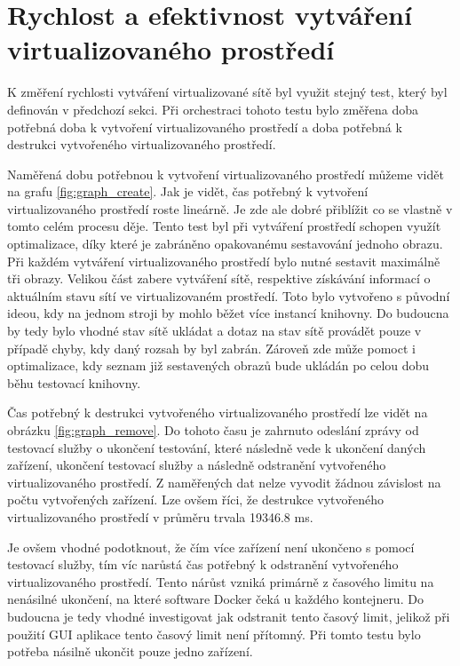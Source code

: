 \section{Rychlost a efektivnost vytváření virtualizovaného prostředí}

K změření rychlosti vytváření virtualizované sítě byl využit stejný test, který byl definován v předchozí sekci. Při orchestraci tohoto testu bylo změřena doba potřebná doba k vytvoření virtualizovaného prostředí a doba potřebná k destrukci vytvořeného virtualizovaného prostředí. 

Naměřená dobu potřebnou k vytvoření virtualizovaného prostředí můžeme vidět na grafu \ref{fig:graph_create}. Jak je vidět, čas potřebný k vytvoření virtualizovaného prostředí roste lineárně. Je zde ale dobré přiblížit co se vlastně v tomto celém procesu děje. Tento test byl při vytváření prostředí schopen využít optimalizace, díky které je zabráněno opakovanému sestavování jednoho obrazu. Při každém vytváření virtualizovaného prostředí bylo nutné sestavit maximálně tři obrazy. Velikou část zabere vytváření sítě, respektive získávání informací o aktuálním stavu sítí ve virtualizovaném prostředí. Toto bylo vytvořeno s původní ideou, kdy na jednom stroji by mohlo běžet více instancí knihovny. Do budoucna by tedy bylo vhodné stav sítě ukládat a dotaz na stav sítě provádět pouze v případě chyby, kdy daný rozsah by byl zabrán. Zároveň zde může pomoct i optimalizace, kdy seznam již sestavených obrazů bude ukládán po celou dobu běhu testovací knihovny.

Čas potřebný k destrukci vytvořeného virtualizovaného prostředí lze vidět na obrázku \ref{fig:graph_remove}. Do tohoto času je zahrnuto odeslání zprávy od testovací služby o ukončení testování, které následně vede k ukončení daných zařízení, ukončení testovací služby a následně odstranění vytvořeného virtualizovaného prostředí. Z naměřených dat nelze vyvodit žádnou závislost na počtu vytvořených zařízení. Lze ovšem říci, že destrukce vytvořeného virtualizovaného prostředí v průměru trvala 19346.8 ms. 

Je ovšem vhodné podotknout, že čím více zařízení není ukončeno s pomocí testovací služby, tím víc narůstá čas potřebný k odstranění vytvořeného virtualizovaného prostředí. Tento nárůst vzniká primárně z časového limitu na nenásilné ukončení, na které software Docker čeká u každého kontejneru. Do budoucna je tedy vhodné investigovat jak odstranit tento časový limit, jelikož při použití GUI aplikace tento časový limit není přítomný. Při tomto testu bylo potřeba násilně ukončit pouze jedno zařízení.

